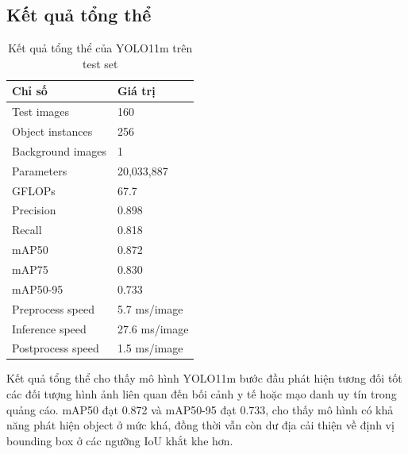 \subsection{Kết quả tổng thể}
\begin{table}[H]
\centering
\caption{Kết quả tổng thể của YOLO11m trên test set}
\label{tab:yolo_overall_metrics}
\begin{tabularx}{\textwidth}{|L{0.38\textwidth}|Y|}
\hline
\textbf{Chỉ số} & \textbf{Giá trị} \\
\hline
Test images & 160 \\ \hline
Object instances & 256 \\ \hline
Background images & 1 \\ \hline
Parameters & 20,033,887 \\ \hline
GFLOPs & 67.7 \\ \hline
Precision & 0.898 \\ \hline
Recall & 0.818 \\ \hline
mAP50 & 0.872 \\ \hline
mAP75 & 0.830 \\ \hline
mAP50-95 & 0.733 \\ \hline
Preprocess speed & 5.7 ms/image \\ \hline
Inference speed & 27.6 ms/image \\ \hline
Postprocess speed & 1.5 ms/image \\ \hline
\end{tabularx}
\end{table}

Kết quả tổng thể cho thấy mô hình YOLO11m bước đầu phát hiện tương đối tốt các đối tượng hình ảnh liên quan đến bối cảnh y tế hoặc mạo danh uy tín trong quảng cáo. mAP50 đạt 0.872 và mAP50-95 đạt 0.733, cho thấy mô hình có khả năng phát hiện object ở mức khá, đồng thời vẫn còn dư địa cải thiện về định vị bounding box ở các ngưỡng IoU khắt khe hơn.

